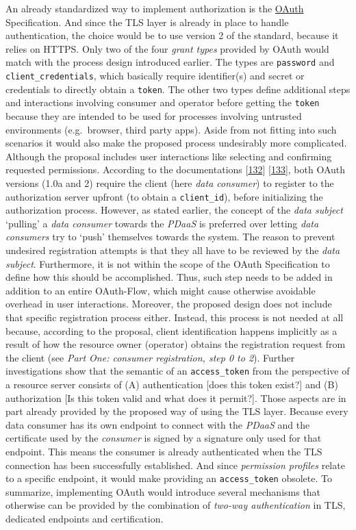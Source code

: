 \documentclass[12pt,english,a4paper,titlepage,cleardoublepage=empty,dottedtoc]{report}
\begin{document}
An already standardized way to implement authorization is the
\protect\hyperlink{def--oauth}{OAuth} Specification. And since the TLS
layer is already in place to handle authentication, the choice would be
to use version 2 of the standard, because it relies on HTTPS. Only two
of the four \emph{grant types} provided by OAuth would match with the
process design introduced earlier. The types are \texttt{password} and
\texttt{client\_credentials}, which basically require identifier(s) and
secret or credentials to directly obtain a \texttt{token}. The other two
types define additional steps and interactions involving consumer and
operator before getting the \texttt{token} because they are intended to
be used for processes involving untrusted environments (e.g.~browser,
third party apps). Aside from not fitting into such scenarios it would
also make the proposed process undesirably more complicated. Although
the proposal includes user interactions like selecting and confirming
requested permissions. According to the documentations
{[}\protect\hyperlink{ref-web_spec_oauth-1a_client-reg}{132}{]}
{[}\protect\hyperlink{ref-web_spec_oauth-2_client-reg}{133}{]}, both
OAuth versions (1.0a and 2) require the client (here \emph{data
consumer}) to register to the authorization server upfront (to obtain a
\texttt{client\_id}), before initializing the authorization process.
However, as stated earlier, the concept of the \emph{data subject}
`pulling' a \emph{data consumer} towards the \emph{PDaaS} is preferred
over letting \emph{data consumers} try to `push' themselves towards the
system. The reason to prevent undesired registration attempts is that
they all have to be reviewed by the \emph{data subject}. Furthermore, it
is not within the scope of the OAuth Specification to define how this
should be accomplished. Thus, such step needs to be added in addition to
an entire OAuth-Flow, which might cause otherwise avoidable overhead in
user interactions. Moreover, the proposed design does not include that
specific registration process either. Instead, this process is not
needed at all because, according to the proposal, client identification
happens implicitly as a result of how the resource owner (operator)
obtains the registration request from the client (see \emph{Part One:
consumer registration, step 0 to 2}). Further investigations show that
the semantic of an \texttt{access\_token} from the perspective of a
resource server consists of (A) authentication {[}does this token
exist?{]} and (B) authorization {[}Is this token valid and what does it
permit?{]}. Those aspects are in part already provided by the proposed
way of using the TLS layer. Because every data consumer has its own
endpoint to connect with the \emph{PDaaS} and the certificate used by
the \emph{consumer} is signed by a signature only used for that
endpoint. This means the consumer is already authenticated when the TLS
connection has been successfully established. And since \emph{permission
profiles} relate to a specific endpoint, it would make providing an
\texttt{access\_token} obsolete. To summarize, implementing OAuth would
introduce several mechanisms that otherwise can be provided by the
combination of \emph{two-way authentication} in TLS, dedicated endpoints
and certification.
\end{document}
